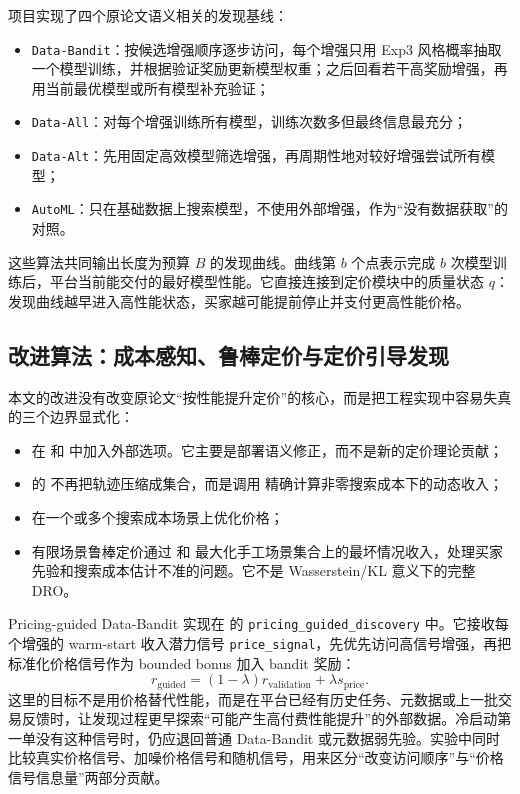 \documentclass[11pt,a4paper]{ctexart}
\theoremstyle{definition}
\begin{document}
项目实现了四个原论文语义相关的发现基线：
\begin{itemize}
\item \texttt{Data-Bandit}：按候选增强顺序逐步访问，每个增强只用 Exp3 风格概率抽取一个模型训练，并根据验证奖励更新模型权重；之后回看若干高奖励增强，再用当前最优模型或所有模型补充验证；
\item \texttt{Data-All}：对每个增强训练所有模型，训练次数多但最终信息最充分；
\item \texttt{Data-Alt}：先用固定高效模型筛选增强，再周期性地对较好增强尝试所有模型；
\item \texttt{AutoML}：只在基础数据上搜索模型，不使用外部增强，作为“没有数据获取”的对照。
\end{itemize}

这些算法共同输出长度为预算 $B$ 的发现曲线。曲线第 $b$ 个点表示完成 $b$ 次模型训练后，平台当前能交付的最好模型性能。它直接连接到定价模块中的质量状态 $q$：发现曲线越早进入高性能状态，买家越可能提前停止并支付更高性能价格。

\subsection{改进算法：成本感知、鲁棒定价与定价引导发现}

本文的改进没有改变原论文“按性能提升定价”的核心，而是把工程实现中容易失真的三个边界显式化：
\begin{itemize}
\item {} 在  和  中加入外部选项。它主要是部署语义修正，而不是新的定价理论贡献；
\item {} 的  不再把轨迹压缩成集合，而是调用  精确计算非零搜索成本下的动态收入；
\item {} 在一个或多个搜索成本场景上优化价格；
\item 有限场景鲁棒定价通过  和  最大化手工场景集合上的最坏情况收入，处理买家先验和搜索成本估计不准的问题。它不是 Wasserstein/KL 意义下的完整 DRO。
\end{itemize}

Pricing-guided Data-Bandit 实现在  的 \texttt{pricing\_guided\_discovery} 中。它接收每个增强的 warm-start 收入潜力信号 \texttt{price\_signal}，先优先访问高信号增强，再把标准化价格信号作为 bounded bonus 加入 bandit 奖励：
\[
r_{\mathrm{guided}}=(1-\lambda)r_{\mathrm{validation}}+\lambda s_{\mathrm{price}}.
\]
这里的目标不是用价格替代性能，而是在平台已经有历史任务、元数据或上一批交易反馈时，让发现过程更早探索“可能产生高付费性能提升”的外部数据。冷启动第一单没有这种信号时，仍应退回普通 Data-Bandit 或元数据弱先验。实验中同时比较真实价格信号、加噪价格信号和随机信号，用来区分“改变访问顺序”与“价格信号信息量”两部分贡献。
\end{document}
